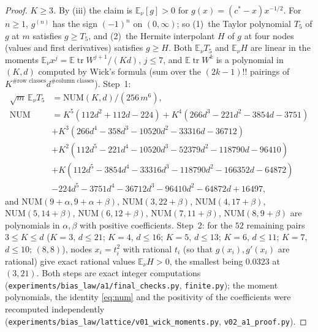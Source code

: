 \documentclass[10pt]{article}
\theoremstyle{definition}
\theoremstyle{remark}
\newcommand{\E}{\mathbb{E}}
\newcommand{\tr}{\operatorname{tr}}
\begin{document}
\begin{proof}
\emph{$K\ge3$.} By (iii) the claim is $\E_\nu[g]>0$ for $g(x)=(c^\ast-x)x^{-1/2}$. For $n\ge1$, $g^{(n)}$ has the sign
$(-1)^n$ on $(0,\infty)$; so (1)~the Taylor polynomial $T_5$ of $g$ at $m$ satisfies $g\ge T_5$, and (2)~the Hermite
interpolant $H$ of $g$ at four nodes (values and first derivatives) satisfies $g\ge H$. Both $\E_\nu T_5$ and $\E_\nu H$
are linear in the moments $\E_\nu x^j=\E\tr W^{j+1}/(Kd)$, $j\le7$, and $\E\tr W^k$ is a polynomial in $(K,d)$ computed by
Wick's formula (sum over the $(2k-1)!!$ pairings of $K^{\#\text{row classes}}d^{\#\text{column classes}}$). Step~1:
\begin{equation}\label{eq:num}
\begin{aligned}
\sqrt m\,\E_\nu T_5&=\mathrm{NUM}(K,d)/(256\,m^6),\\
\mathrm{NUM}&=K^5(112d^2+112d-224)+K^4(266d^3-221d^2-3854d-3751)\\
&+K^3(266d^4-358d^3-10520d^2-33316d-36712)\\
&+K^2(112d^5-221d^4-10520d^3-52379d^2-118790d-96410)\\
&+K(112d^5-3854d^4-33316d^3-118790d^2-166352d-64872)\\
&-224d^5-3751d^4-36712d^3-96410d^2-64872d+16497,
\end{aligned}
\end{equation}
and $\mathrm{NUM}(9+\alpha,9+\alpha+\beta)$, $\mathrm{NUM}(3,22+\beta)$, $\mathrm{NUM}(4,17+\beta)$, $\mathrm{NUM}(5,14+\beta)$,
$\mathrm{NUM}(6,12+\beta)$, $\mathrm{NUM}(7,11+\beta)$, $\mathrm{NUM}(8,9+\beta)$ are polynomials in $\alpha,\beta$ with
positive coefficients. Step~2: for the $52$ remaining pairs $3\le K\le d$ ($K=3$, $d\le21$; $K=4$, $d\le16$; $K=5$,
$d\le13$; $K=6$, $d\le11$; $K=7$, $d\le10$; $(8,8)$), nodes $x_i=t_i^2$ with rational $t_i$ (so that $g(x_i),g'(x_i)$
are rational) give exact rational values $\E_\nu H>0$, the smallest being $0.0323$ at $(3,21)$. Both steps are exact
integer computations (\texttt{experiments/bias\_law/a1/final\_checks.py}, \texttt{finite.py}); the moment polynomials, the identity
\eqref{eq:num} and the positivity of the coefficients were recomputed independently
(\texttt{experiments/bias\_law/lattice/v01\_wick\_moments.py}, \texttt{v02\_a1\_proof.py}).
\end{proof}
\end{document}
